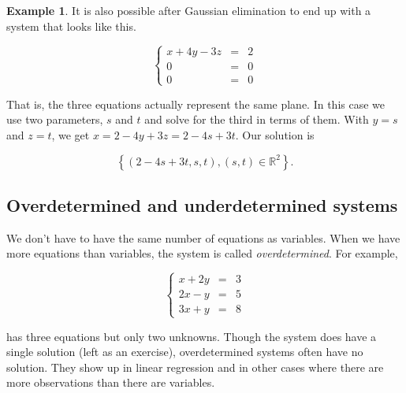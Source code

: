 \documentclass[
]{book}
\theoremstyle{definition}
\theoremstyle{definition}
\newtheorem{example}{Example}[chapter]
\theoremstyle{definition}
\theoremstyle{definition}
\theoremstyle{remark}
\begin{document}
\begin{examplebox}

\begin{example}
\protect\hypertarget{exm:tfv}{}\label{exm:tfv}It is also possible after Gaussian elimination to end up with a system that looks like this.

\begin{equation*}
    \left\{
    \begin{array}{rcl}
    x+4y-3z&=&2\\
    0&=&0\\
    0&=&0
    \end{array} \right. 
\end{equation*}

That is, the three equations actually represent the same plane. In this case we use two parameters, \(s\) and \(t\) and solve for the third in terms of them. With \(y=s\) and \(z=t\), we get \(x=2-4y+3z=2-4s+3t\). Our solution is

\[\left\{(2-4s+3t,s,t),(s,t)\in \mathbb{R}^2\right\}.\]
\end{example}

\end{examplebox}

\subsection*{Overdetermined and underdetermined systems}\label{overdetermined-and-underdetermined-systems}

We don't have to have the same number of equations as variables. When we have more equations than variables, the system is called \emph{overdetermined}. For example,

\begin{equation*}
    \left\{
    \begin{array}{ccl}
    x+2y&=&3\\
    2x-y&=&5\\
    3x+y&=&8 \end{array} \right.
\end{equation*}

has three equations but only two unknowns. Though the system does have a single solution (left as an exercise), overdetermined systems often have no solution. They show up in linear regression and in other cases where there are more observations than there are variables.
\end{document}
